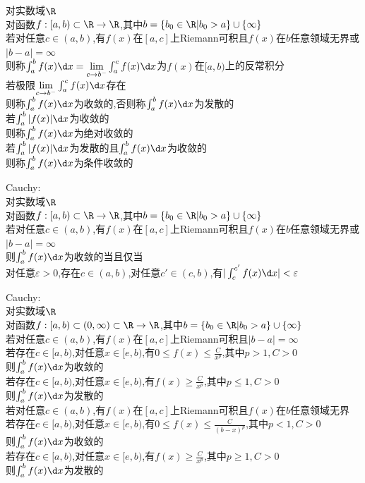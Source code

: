 \begin{dingyi}
对实数域$\R$\\
对函数$f:[a,b)\subset \R \to \R$,其中$b=\{b_0\in\R|b_0>a\}\cup\{\infty\}$\\
若对任意$c\in(a,b)$,有$f(x)$在$[a,c]$上Riemann可积且$f(x)$在$b$任意领域无界或$|b-a|=\infty$\\
则称$\int_{a}^{b}f(x)\d x=\lim\limits_{c\to b^{-}}\int_{a}^{c}f(x)\d x$为$f(x)$在$[a,b)$上的反常积分\\
若极限$\lim\limits_{c\to b^{-}}\int_{a}^{c}f(x)\d x$存在\\
则称$\int_{a}^{b}f(x)\d x$为收敛的,否则称$\int_{a}^{b}f(x)\d x$为发散的\\
若$\int_{a}^{b}|f(x)|\d x$为收敛的\\
则称$\int_{a}^{b}f(x)\d x$为绝对收敛的\\
若$\int_{a}^{b}|f(x)|\d x$为发散的且$\int_{a}^{b}f(x)\d x$为收敛的\\
则称$\int_{a}^{b}f(x)\d x$为条件收敛的
\end{dingyi}

\begin{dingli}
Cauchy:\\
对实数域$\R$\\
对函数$f:[a,b)\subset \R \to \R$,其中$b=\{b_0\in\R|b_0>a\}\cup\{\infty\}$\\
若对任意$c\in(a,b)$,有$f(x)$在$[a,c]$上Riemann可积且$f(x)$在$b$任意领域无界或$|b-a|=\infty$\\
则$\int_{a}^{b}f(x)\d x$为收敛的当且仅当\\
对任意$\varepsilon>0$,存在$c\in (a,b)$,对任意$c'\in (c,b)$,有$|\int_{c}^{c'}f(x)\d x|<\varepsilon$
\end{dingli}

\begin{dingli}
Cauchy:\\
对实数域$\R$\\
对函数$f:[a,b)\subset(0,\infty)\subset \R \to \R$,其中$b=\{b_0\in\R|b_0>a\}\cup\{\infty\}$\\
若对任意$c\in(a,b)$,有$f(x)$在$[a,c]$上Riemann可积且$|b-a|=\infty$\\
若存在$c\in [a,b)$,对任意$x\in [e,b)$,有$0\leq f(x)\leq \frac{C}{x^p}$,其中$p>1,C>0$\\
则$\int_{a}^{b}f(x)\d x$为收敛的\\
若存在$c\in [a,b)$,对任意$x\in [e,b)$,有$f(x)\geq \frac{C}{x^p}$,其中$p\leq 1,C>0$\\
则$\int_{a}^{b}f(x)\d x$为发散的\\
若对任意$c\in(a,b)$,有$f(x)$在$[a,c]$上Riemann可积且$f(x)$在$b$任意领域无界\\
若存在$c\in [a,b)$,对任意$x\in [e,b)$,有$0\leq f(x)\leq \frac{C}{(b-x)^p}$,其中$p<1,C>0$\\
则$\int_{a}^{b}f(x)\d x$为收敛的\\
若存在$c\in [a,b)$,对任意$x\in [e,b)$,有$f(x)\geq \frac{C}{x^p}$,其中$p\geq 1,C>0$\\
则$\int_{a}^{b}f(x)\d x$为发散的
\end{dingli}

